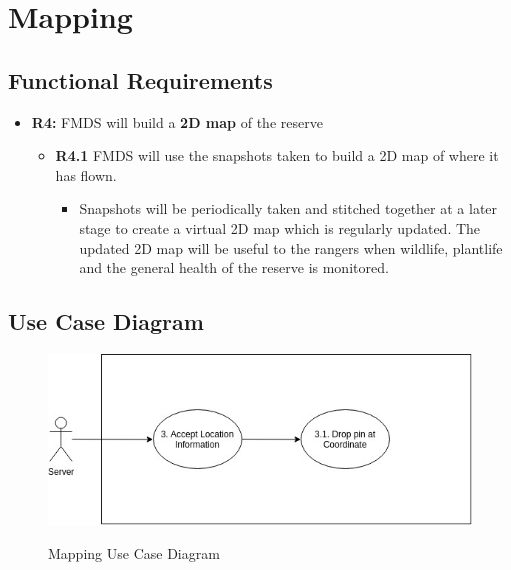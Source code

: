 \section{Mapping}

\subsection{Functional Requirements}

	\begin{flushleft}
		\begin{itemize}
			\item{\textbf{R4:}} FMDS will build a \textbf{2D map} of the reserve

				\begin{itemize}
					\item{\textbf{R4.1}} FMDS will use the snapshots taken to build a 2D map of where it has flown.
						\begin{itemize}
							\item Snapshots will be periodically taken and stitched together at a later stage to create a virtual 2D map which is regularly updated. The updated 2D map will be useful to the rangers when wildlife, plantlife and the general health of the reserve is monitored.
						\end{itemize} 
				\end{itemize}
		\end{itemize}
	\end{flushleft}

\subsection{Use Case Diagram}
	\begin{center}
		\begin{flushleft}
			\begin{figure}[h!]
				\centering
				\includegraphics[scale=0.45]{./assets/images/mapping-ucd.jpg}
				\label{fig: object-recognition-ucd }
				\caption{Mapping Use Case Diagram}
			\end{figure}
		\end{flushleft}
	\end{center}
